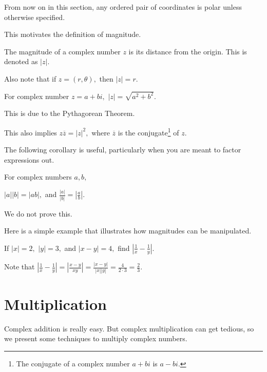 \documentclass{article}
\begin{document}
From now on in this section, any ordered pair of coordinates is polar unless otherwise specified.

This motivates the definition of magnitude.

\begin{defi}[Magnitude]
The magnitude of a complex number $z$ is its distance from the origin. This is denoted as $|z|.$

Also note that if $z=(r,\theta),$ then $|z|=r.$
\end{defi}

\begin{fact}[$|z|=\sqrt{a^2+b^2}$]
For complex number $z=a+bi,$ $|z|=\sqrt{a^2+b^2}.$
\end{fact}

This is due to the Pythagorean Theorem.

\begin{corollary}
This also implies $z\overline{z}=|z|^2,$ where $\overline{z}$ is the conjugate\footnote{The conjugate of a complex number $a+bi$ is $a-bi.$} of $z.$
\end{corollary}

The following corollary is useful, particularly when you are meant to factor expressions out.

\begin{fact}
For complex numbers $a,b,$
\begin{itemize}
\Item $|a||b|=|ab|,$ and
\Item $\frac{|a|}{|b|}=|\frac{a}{b}|.$
\end{itemize}
\end{fact}

We do not prove this.

Here is a simple example that illustrates how magnitudes can be manipulated.

\begin{exam}
If $|x|=2,$ $|y|=3,$ and $|x-y|=4,$ find $|\frac{1}{x}-\frac{1}{y}|.$
\end{exam}

\begin{sol}
Note that $|\frac{1}{x}-\frac{1}{y}|=|\frac{x-y}{xy}|=\frac{|x-y|}{|x||y|}=\frac{4}{2\cdot 3}=\frac{2}{3}.$
\end{sol}

\section{Multiplication}

Complex addition is really easy. But complex multiplication can get tedious, so we present some techniques to multiply complex numbers.
\end{document}
